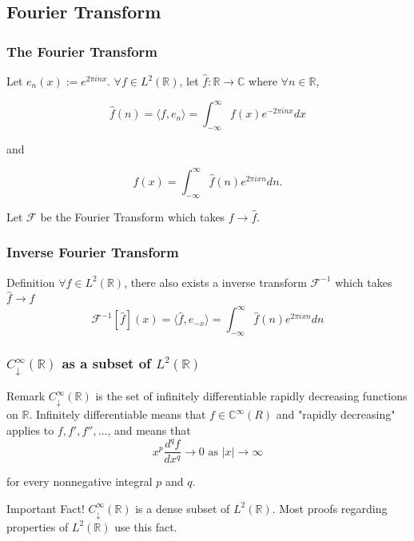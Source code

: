 \documentclass{beamer}
\newcommand{\C}{\mathbb{C}}
\newcommand{\h}[1]{\hat{#1}}
\newcommand{\R}{\mathbb{R}}
\newcommand{\abs}[1]{\left\lvert #1\right\rvert}
\newcommand{\angles}[1]{\langle #1 \rangle}
\begin{document}
\subsection{Fourier Transform}
\begin{frame}
    \frametitle{The Fourier Transform}


    \begin{definition}
        Let $e_n(x) := e^{2 \pi i n x}$.
        $\forall f \in L^2(\R)$, let $\h{f} : \R \to \C$ where $\forall n \in \R$, 
        
        \[\h{f}(n) = \angles{f, e_n} = \int_{-\infty}^{\infty}f(x) e^{-2 \pi i n x} dx\] 
        
        and 

        \[
        f(x) = \int_{-\infty}^{\infty}\h{f}(n) e^{2 \pi i x n} dn. 
        \]

        Let $\mathcal{F}$ be the Fourier Transform which takes $f \to \h{f}$.   
    \end{definition}
    

\end{frame}

\begin{frame}
    \frametitle{Inverse Fourier Transform}


    \begin{block}{Definition}
        $\forall f \in L^2(\R)$, there also exists a inverse transform $\mathcal{F}^{-1}$ which takes $\h{f} \to f$ \[
        \mathcal{F}^{-1}[\h{f}](x) = \angles{\h{f}, e_{-x}}= \int_{-\infty}^{\infty} \h{f}(n) e^{2 \pi i x n} dn
        \] 
    \end{block}

\end{frame}

\begin{frame}
    \frametitle{$C_{\downarrow}^{\infty}(\R)$ as a subset of $L^2(\R)$ }

    \begin{block}{Remark}
        $C_{\downarrow}^{\infty}(\R)$ is the set of infinitely differentiable rapidly decreasing functions on $\R$. Infinitely differentiable means that $f \in \C^{\infty}(R)$ and "rapidly decreasing" applies to $f, f', f'', \dots$, and means that \[
        x^p \frac{d^q f}{dx^q} \to 0 \text{ as } \abs{x} \to \infty 
        \]
        
        for every nonnegative integral $p$ and $q$.   
    \end{block}

    \pause

    \begin{block}{Important Fact!}
        $C_{\downarrow}^{\infty}(\R)$ is a dense subset of $L^{2}(\R)$. Most proofs regarding properties of $L^2(\R)$ use this fact.    
    \end{block}
\end{frame}
\end{document}
